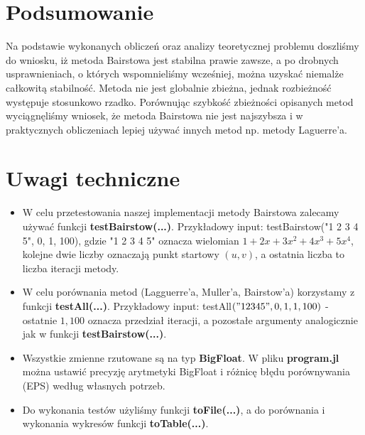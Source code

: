 \documentclass{article}
\begin{document}
\section*{Podsumowanie}

Na podstawie wykonanych obliczeń oraz analizy teoretycznej problemu doszliśmy do wniosku, iż metoda Bairstowa jest stabilna prawie zawsze, a po drobnych usprawnieniach, o których wspomnieliśmy wcześniej, można uzyskać niemalże całkowitą stabilność. Metoda nie jest globalnie zbieżna, jednak rozbieżność występuje stosunkowo rzadko. Porównując szybkość zbieżności opisanych metod wyciągnęliśmy wniosek, że metoda Bairstowa nie jest najszybsza i w praktycznych obliczeniach lepiej używać innych metod np. metody Laguerre'a.


\section*{Uwagi techniczne}

\begin{itemize}
	\item W celu przetestowania naszej implementacji metody Bairstowa zalecamy używać funkcji \textbf{testBairstow(...)}. Przykładowy input: testBairstow("1 2 3 4 5", 0, 1, 100), gdzie "1 2 3 4 5" oznacza wielomian $1 + 2x + 3x^2 + 4x^3 + 5x^4$, kolejne dwie liczby oznaczają punkt startowy $(u,v)$, a ostatnia liczba to liczba iteracji metody.
	\item W celu porównania metod (Lagguerre'a, Muller'a, Bairstow'a) korzystamy z funkcji \textbf{testAll(...)}. Przykładowy input: testAll$("1 2 3 4 5", 0, 1, 1, 100)$ - ostatnie $1, 100$ oznacza przedział iteracji, a pozostałe argumenty analogicznie jak w funkcji \textbf{testBairstow(...)}. 
	\item Wszystkie zmienne rzutowane są na typ \textbf{BigFloat}. W pliku \textbf{program.jl} można ustawić precyzję arytmetyki BigFloat i różnicę błędu porównywania (EPS) według własnych potrzeb.
	\item Do wykonania testów użyliśmy funkcji \textbf{toFile(...)}, a do porównania i wykonania wykresów funkcji \textbf{toTable(...)}.
\end{itemize}
\end{document}
